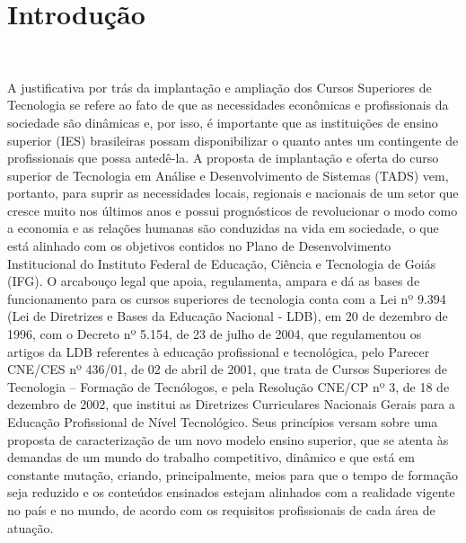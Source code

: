 \documentclass[11pt,fleqn]{book} %
\begin{document}
\chapter{Introdução}\label{introducao}
\vspace{6em}
\begin{flushright}
	\textit{\textcolor{white}{Um bonita citação...}}
\end{flushright}
\vspace{12em}

A justificativa por trás da implantação e ampliação dos Cursos Superiores de Tecnologia se refere ao fato de que as necessidades econômicas e profissionais da sociedade são dinâmicas e, por isso, é importante que as instituições de ensino superior (IES) brasileiras possam disponibilizar o quanto antes um contingente de profissionais que possa antedê-la. A proposta de implantação e oferta do curso superior de Tecnologia em Análise e Desenvolvimento de Sistemas (TADS) vem, portanto, para suprir as necessidades locais, regionais e nacionais de um setor que cresce muito nos últimos anos e possui prognósticos de revolucionar o modo como a economia e as relações humanas são conduzidas na vida em sociedade, o que está alinhado com os objetivos contidos no Plano de Desenvolvimento Institucional do Instituto Federal de Educação, Ciência e Tecnologia de Goiás (IFG).
O arcabouço legal que apoia, regulamenta, ampara e dá as bases de funcionamento para os cursos superiores de tecnologia conta com a Lei nº 9.394 (Lei de Diretrizes e Bases da Educação Nacional -
LDB), em 20 de dezembro de 1996, com o Decreto nº 5.154, de
23 de julho de 2004, que regulamentou os artigos da LDB referentes à educação profissional e tecnológica, pelo Parecer CNE/CES nº 436/01, de 02 de abril de 2001, que trata de Cursos Superiores de Tecnologia – Formação de Tecnólogos, e pela Resolução CNE/CP nº 3, de 18 de dezembro de 2002, que institui as Diretrizes Curriculares Nacionais Gerais para a Educação Profissional de Nível Tecnológico. Seus princípios versam sobre uma proposta de caracterização de
um novo modelo ensino superior, que se atenta às demandas de um mundo do trabalho competitivo, dinâmico e que está em constante mutação, criando, principalmente, meios para que o tempo de formação seja reduzido e os conteúdos ensinados estejam alinhados com a realidade vigente no país e no mundo, de acordo com os requisitos profissionais de cada área de atuação. 
\end{document}
